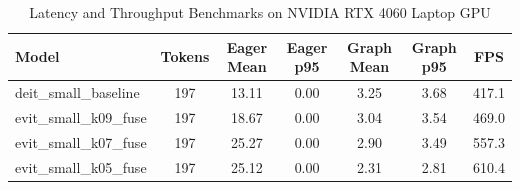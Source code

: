 \begin{table}[t]
\centering
\caption{Latency and Throughput Benchmarks on NVIDIA RTX 4060 Laptop GPU}
\label{tab:hardware_profiles}
\small
\begin{tabular}{lcccccc}
\hline
\textbf{Model} & \textbf{Tokens} & \textbf{Eager Mean} & \textbf{Eager p95} & \textbf{Graph Mean} & \textbf{Graph p95} & \textbf{FPS} \\
\hline
deit_small_baseline & 197 & 13.11 & 0.00 & 3.25 & 3.68 & 417.1 \\
evit_small_k09_fuse & 197 & 18.67 & 0.00 & 3.04 & 3.54 & 469.0 \\
evit_small_k07_fuse & 197 & 25.27 & 0.00 & 2.90 & 3.49 & 557.3 \\
evit_small_k05_fuse & 197 & 25.12 & 0.00 & 2.31 & 2.81 & 610.4 \\
\hline
\end{tabular}
\end{table}
